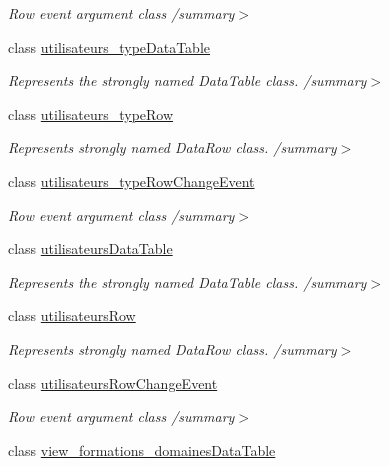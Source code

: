 \begin{DoxyCompactItemize}
\begin{DoxyCompactList}\small\item\em Row event argument class /summary$>$ \end{DoxyCompactList}\item 
class \hyperlink{classforma_1_1formadb_data_set_1_1utilisateurs__type_data_table}{utilisateurs\+\_\+type\+Data\+Table}
\begin{DoxyCompactList}\small\item\em Represents the strongly named Data\+Table class. /summary$>$ \end{DoxyCompactList}\item 
class \hyperlink{classforma_1_1formadb_data_set_1_1utilisateurs__type_row}{utilisateurs\+\_\+type\+Row}
\begin{DoxyCompactList}\small\item\em Represents strongly named Data\+Row class. /summary$>$ \end{DoxyCompactList}\item 
class \hyperlink{classforma_1_1formadb_data_set_1_1utilisateurs__type_row_change_event}{utilisateurs\+\_\+type\+Row\+Change\+Event}
\begin{DoxyCompactList}\small\item\em Row event argument class /summary$>$ \end{DoxyCompactList}\item 
class \hyperlink{classforma_1_1formadb_data_set_1_1utilisateurs_data_table}{utilisateurs\+Data\+Table}
\begin{DoxyCompactList}\small\item\em Represents the strongly named Data\+Table class. /summary$>$ \end{DoxyCompactList}\item 
class \hyperlink{classforma_1_1formadb_data_set_1_1utilisateurs_row}{utilisateurs\+Row}
\begin{DoxyCompactList}\small\item\em Represents strongly named Data\+Row class. /summary$>$ \end{DoxyCompactList}\item 
class \hyperlink{classforma_1_1formadb_data_set_1_1utilisateurs_row_change_event}{utilisateurs\+Row\+Change\+Event}
\begin{DoxyCompactList}\small\item\em Row event argument class /summary$>$ \end{DoxyCompactList}\item 
class \hyperlink{classforma_1_1formadb_data_set_1_1view__formations__domaines_data_table}{view\+\_\+formations\+\_\+domaines\+Data\+Table}

\end{DoxyCompactItemize}
